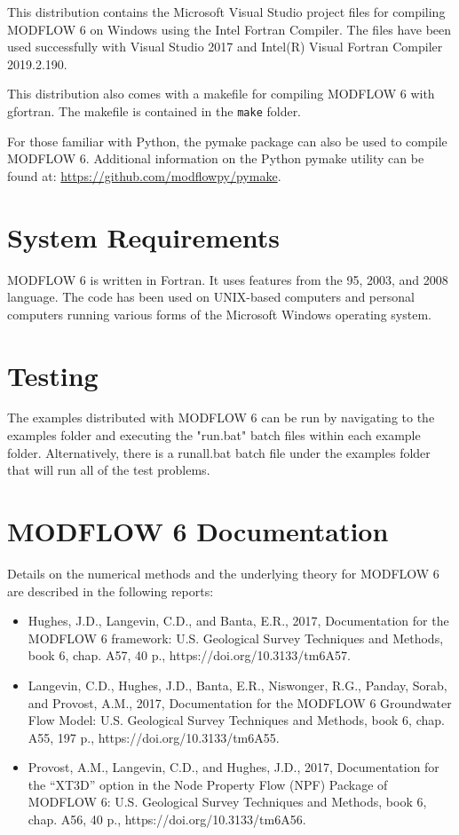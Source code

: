 \documentclass[11pt,twoside,twocolumn]{usgsreport}
\begin{document}
This distribution contains the Microsoft Visual Studio project files for compiling MODFLOW 6 on Windows using the Intel Fortran Compiler.  The files have been used successfully with Visual Studio 2017 and Intel(R) Visual Fortran Compiler 2019.2.190.

This distribution also comes with a makefile for compiling MODFLOW 6 with gfortran.  The makefile is contained in the \texttt{make} folder.

For those familiar with Python, the pymake package can also be used to compile MODFLOW 6.  Additional information on the Python pymake utility can be found at: \url{https://github.com/modflowpy/pymake}.  

\section{System Requirements}
MODFLOW 6 is written in Fortran.  It uses features from the 95, 2003, and 2008 language.  The code has been used on UNIX-based computers and personal computers running various forms of the Microsoft Windows operating system.

\section{Testing}
The examples distributed with MODFLOW 6 can be run by navigating to the examples folder and executing the "run.bat" batch files within each example folder.  Alternatively, there is a runall.bat batch file under the examples folder that will run all of the test problems.

\section{MODFLOW 6 Documentation}
Details on the numerical methods and the underlying theory for MODFLOW 6 are described in the following reports:

\begin{itemize}
\item
Hughes, J.D., Langevin, C.D., and Banta, E.R., 2017, Documentation for the MODFLOW 6 framework: U.S. Geological Survey Techniques and Methods, book 6, chap. A57, 40 p., https://doi.org/10.3133/tm6A57.

\item
Langevin, C.D., Hughes, J.D., Banta, E.R., Niswonger, R.G., Panday, Sorab, and Provost, A.M., 2017, Documentation for the MODFLOW 6 Groundwater Flow Model: U.S. Geological Survey Techniques and Methods, book 6, chap. A55, 197 p., https://doi.org/10.3133/tm6A55.

\item
Provost, A.M., Langevin, C.D., and Hughes, J.D., 2017, Documentation for the ``XT3D'' option in the Node Property Flow (NPF) Package of MODFLOW 6: U.S. Geological Survey Techniques and Methods, book 6, chap. A56, 40 p., https://doi.org/10.3133/tm6A56.

\end{itemize}
 
\end{document}
